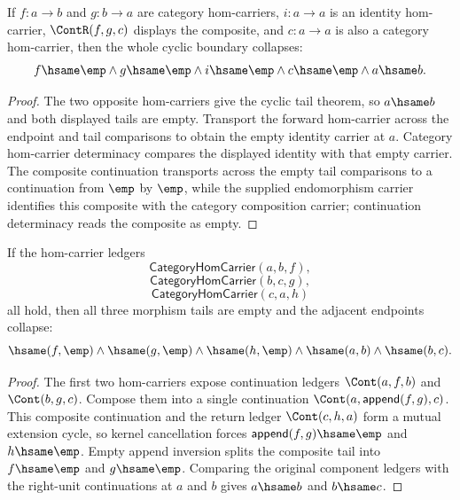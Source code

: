 \begin{theorem}
\label{thm:category-hom-carrier-split-mono-witness-empty-boundary}
If $f:a\to b$ and $g:b\to a$ are category hom-carriers, $i:a\to a$ is an
identity hom-carrier, $\ContR(f,g,c)$ displays the composite, and $c:a\to a$
is also a category hom-carrier, then the whole cyclic boundary collapses:
$$
f\hsame\emp\land g\hsame\emp\land i\hsame\emp\land c\hsame\emp
\land a\hsame b.
$$
\end{theorem}
\begin{proof}
The two opposite hom-carriers give the cyclic tail theorem, so $a\hsame b$ and
both displayed tails are empty. Transport the forward hom-carrier across the
endpoint and tail comparisons to obtain the empty identity carrier at $a$.
Category hom-carrier determinacy compares the displayed identity with that
empty carrier. The composite continuation transports across the empty tail
comparisons to a continuation from $\emp$ by $\emp$, while the supplied
endomorphism carrier identifies this composite with the category composition
carrier; continuation determinacy reads the composite as empty.
\end{proof}

\begin{theorem}
\label{thm:category-hom-carrier-triangle-cycle-tails-empty}
If the hom-carrier ledgers
$$
\mathsf{CategoryHomCarrier}(a,b,f),
$$
$$
\mathsf{CategoryHomCarrier}(b,c,g),
$$
$$
\mathsf{CategoryHomCarrier}(c,a,h)
$$
all hold, then all three morphism tails are empty and the adjacent endpoints
collapse:
$$
\hsame(f,\emp)\land
\hsame(g,\emp)\land
\hsame(h,\emp)\land
\hsame(a,b)\land
\hsame(b,c).
$$
\end{theorem}
\begin{proof}
The first two hom-carriers expose continuation ledgers
$\Cont(a,f,b)$ and $\Cont(b,g,c)$. Compose them into a single continuation
$\Cont(a,\mathsf{append}(f,g),c)$. This composite continuation and the return
ledger $\Cont(c,h,a)$ form a mutual extension cycle, so kernel cancellation
forces $\mathsf{append}(f,g)\hsame\emp$ and $h\hsame\emp$. Empty append
inversion splits the composite tail into $f\hsame\emp$ and $g\hsame\emp$.
Comparing the original component ledgers with the right-unit continuations at
$a$ and $b$ gives $a\hsame b$ and $b\hsame c$.
\end{proof}

